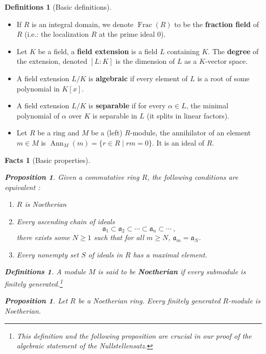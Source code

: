\documentclass{tufte-handout} %
\newtheorem{prop}[thm]{Proposition}
\newtheorem{facts}[thm]{Facts}
\theoremstyle{definition}
\newtheorem{defns}[thm]{Definitions}
\theoremstyle{remark}
\DeclareMathOperator{\ff}{Frac}
\DeclareMathOperator{\ann}{Ann}
\begin{document}
\begin{defns}[Basic definitions]
\begin{itemize}
		\item If $R$ is an integral domain, we denote $\ff(R)$ to be the \textbf{fraction field} of $R$ (i.e.: the localization $R$ at the prime ideal 0).
		\item Let $K$ be a field, a \textbf{field extension} is a field $L$ containing $K$. The \textbf{degree} of the extension, denoted $[L:K]$ is the dimension of $L$ as a $K$-vector space.
		\item A field extension $L/K$ is \textbf{algebraic} if every element of $L$ is a root of some polynomial in $K[x]$.
		\item A field extension $L/K$ is \textbf{separable} if for every $\alpha \in L$, the minimal polynomial of $\alpha$ over $K$ is separable in $L$ (it splits in linear factors).
		\item Let $R$ be a ring and $M$ be a (left) $R$-module, the annihilator of an element $m \in M$ is $\ann_{M}(m) = \{r \in R \mid rm = 0\}$. It is an ideal of $R$.
	\end{itemize}
\end{defns}
\begin{facts}[Basic properties]
	\begin{prop}
	    Given a commutative ring $R$, the following conditions are equivalent :
	    \begin{enumerate}
	        \item[a)] $R$ is Noetherian
	        \item[b)] Every ascending chain of ideals
	        \[
	            \mathfrak{a}_1 \subset \mathfrak{a}_2 \subset \cdots \subset \mathfrak{a}_n \subset \cdots \ ,
	        \]
	        there exists some $N \geq 1$ such that for all $m \geq N$, $\mathfrak{a}_m = \mathfrak{a}_N$.
	        \item[c)] Every nonempty set $S$ of ideals in $R$ has a maximal element.
	    \end{enumerate}
	\end{prop}
	
	\begin{defns}
	    A module $M$ is said to be \textbf{Noetherian} if every submodule is finitely generated.\footnote{This definition and the following proposition are crucial in our proof of the algebraic statement of the Nullstellensatz.}
	\end{defns}
	
	\begin{prop}
	    Let $R$ be a Noetherian ring. Every finitely generated $R$-module is Noetherian.
	\end{prop}
\end{facts}
\end{document}
